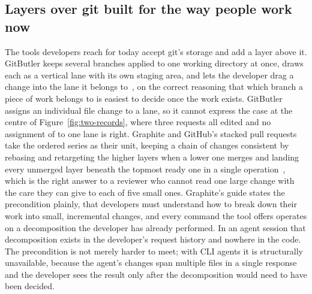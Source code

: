 \subsection{Layers over git built for the way people work now}

The tools developers reach for today accept git's storage and add a layer above
it. GitButler keeps several branches applied to one working directory at once,
draws each as a vertical lane with its own staging area, and lets the developer
drag a change into the lane it belongs to~\cite{gitbutler2026}, on the correct
reasoning that which branch a piece of work belongs to is easiest to decide once
the work exists. GitButler assigns an individual file change to a lane, so it
cannot express the case at the centre of Figure~\ref{fig:two-records}, where three
requests all edited  and no assignment of  to one
lane is right. Graphite and GitHub's stacked pull requests take the ordered series
as their unit, keeping a chain of changes consistent by rebasing and retargeting
the higher layers when a lower one merges and landing every unmerged layer beneath
the topmost ready one in a single
operation~\cite{graphite2026,githubstacked2026}, which is the right answer to a
reviewer who cannot read one large change with the care they can give to each of
five small ones. Graphite's guide states the precondition plainly, that developers
must understand how to break down their work into small, incremental changes, and
every command the tool offers operates on a decomposition the developer has
already performed. In an agent session that decomposition exists in the
developer's request history and nowhere in the code. The precondition is not
merely harder to meet; with CLI agents it is structurally unavailable, because
the agent's changes span multiple files in a single response and the developer
sees the result only after the decomposition would need to have been decided.

